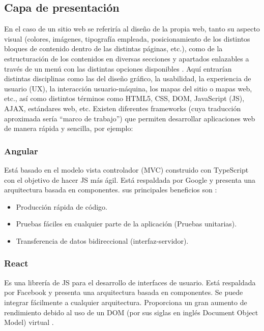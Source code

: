 % 

\subsection{Capa de presentación}

En el caso de un sitio web se referiría al diseño de la propia web, tanto su 
aspecto visual (colores, imágenes, tipografía empleada, posicionamiento de los 
distintos bloques de contenido dentro de las distintas páginas, etc.), como de 
la estructuración de los contenidos en diversas secciones y apartados enlazables 
a través de un menú con las distintas opciones disponibles 
\cite{webapp:def:arqui:web}. Aquí entrarían 
distintas disciplinas como las del diseño gráfico, la usabilidad, la experiencia 
de usuario (UX), la interacción usuario-máquina, los mapas del sitio o mapas 
web, etc., así como distintos términos como HTML5, CSS, DOM, JavaScript (JS), 
AJAX, estándares web, etc. Existen diferentes frameworks (cuya traducción 
aproximada sería “marco de trabajo”) que permiten desarrollar aplicaciones web 
de manera rápida y sencilla, por ejemplo: \\

\label{sub:angular}
\subsubsection{Angular}
Está basado en el modelo vista controlador (MVC) construido con TypeScript con 
el objetivo de hacer JS más ágil. Está respaldada por Google y presenta una 
arquitectura basada en componentes. sus principales beneficios son 
\cite{webapp:five:javascript:frameworks}:
\begin{itemize}
	\item Producción rápida de código.
	\item Pruebas fáciles en cualquier parte de la aplicación (Pruebas 
		unitarias).
	\item Transferencia de datos bidireccional (interfaz-servidor).
\end{itemize}

\label{sub:react}
\subsubsection{React}
Es una librería de JS para el desarrollo de interfaces de usuario. Está 
respaldada por Facebook y presenta una arquitectura basada en componentes. Se 
puede integrar fácilmente a cualquier arquitectura. Proporciona un gran aumento 
de rendimiento debido al uso de un DOM (por sus siglas en inglés Document Object 
Model) virtual \cite{webapp_react}.
